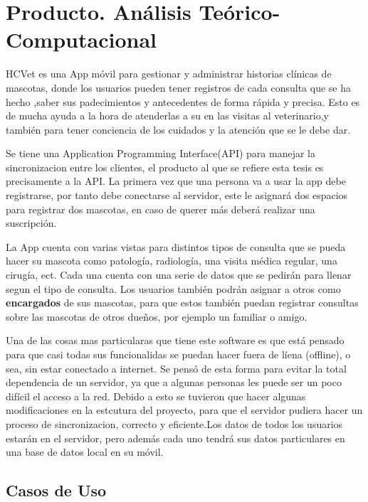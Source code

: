 \chapter{Producto. Análisis Teórico-Computacional}\label{chapter:proposal}

HCVet es una App móvil para gestionar y administrar historias clínicas de mascotas, donde los usuarios pueden tener registros de cada consulta que se ha hecho ,saber sus padecimientos y antecedentes de forma rápida y precisa. Esto es de mucha ayuda a la hora de atenderlas a su en las visitas al veterinario,y también para tener conciencia de los cuidados y la atención que se le debe dar.

Se tiene una Application Programming Interface(API) para manejar la sincronizacion entre los clientes, el producto al que se refiere esta tesis es precisamente a la API. La primera vez que una persona va a usar la app debe registrarse, por tanto debe conectarse al servidor, este le asignará dos espacios para registrar dos mascotas, en caso de querer más deberá realizar una suscripción.

La App cuenta con varias vistas para distintos tipos de consulta que se pueda hacer su mascota como patología, radiología, una visita médica regular, una cirugía, ect. Cada una cuenta con una serie de datos que se pedirán para llenar segun el tipo de consulta. Los usuarios también podrán asignar a otros como \textbf{encargados} de sus mascotas, para que estos también puedan registrar consultas sobre  las mascotas de otros dueños, por ejemplo un familiar o amigo.

Una de las cosas mas particularas que tiene este software es que está pensado para que casi todas sus funcionalidas se puedan hacer fuera de líena (offline), o sea, sin estar conectado a internet. Se pensó de esta forma para evitar la total dependencia de un servidor, ya que a algunas personas les puede ser un poco difícil el acceso a la red. Debido a esto se tuvieron que hacer algunas modificaciones en la estcutura del proyecto, para que el servidor pudiera hacer un proceso de sincronizacion, correcto y eficiente.Los datos de todos los usuarios estarán en el servidor, pero además cada uno tendrá sus datos particulares en una base de datos local en su móvil. 

\section{Casos de Uso}

